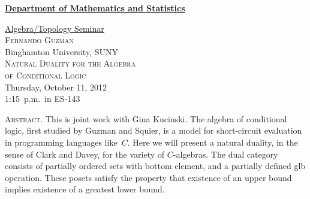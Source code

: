 \documentclass[12pt]{article}
\begin{document}
\noindent\hspace{-28pt}\raisebox{-19pt}{\XeTeXpicfile UAlogo.jpg scaled 340}%
\hfill\textsf{\textbf{\footnotesize\href{http://www.albany.edu/math/}{Department of Mathematics and Statistics}}}\bigskip\bigskip

\begin{center}\Large
  \textsf{\huge \href{http://www.albany.edu/~mv312143/seminar/}{Algebra/Topology Seminar}}\\[2.5\bigskipamount]
  \textsc{\LARGE Fernando Guzman}\\
  Binghamton University, SUNY\\[1.5\bigskipamount]
  \textsc{\LARGE Natural Duality for the Algebra\\ of Conditional Logic}\\[2\bigskipamount]
  Thursday, October 11, 2012\\1:15~p.m.\ in ES-143\\[3\bigskipamount]
\end{center}

\noindent\large\textsc{Abstract.}
This is joint work with Gina Kucinski.
The algebra of conditional logic, first studied by Guzman and Squier, is a model for short-circuit evaluation in programming languages like~$C$.
Here we will present a natural duality, in the sense of Clark and Davey, for the variety of $C$-algebras.
The dual category consists of partially ordered sets with bottom element, and a partially defined \textup{glb} operation.
These posets satisfy the property that existence of an upper bound implies existence of a greatest lower bound.
\end{document}

